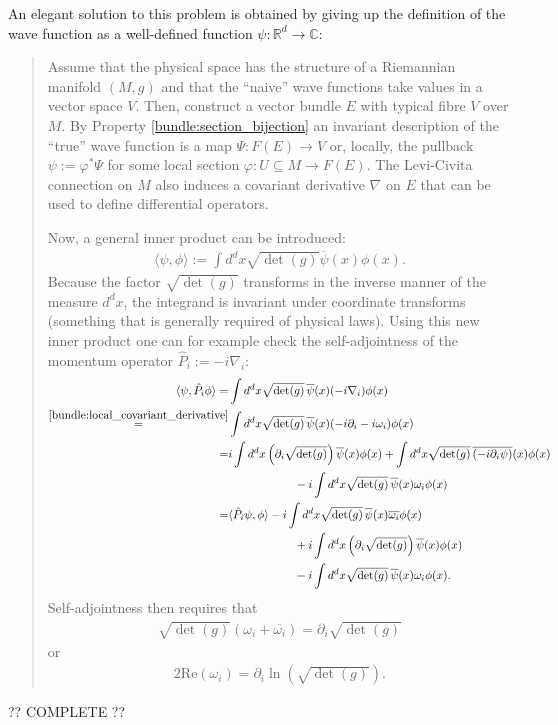     An elegant solution to this problem is obtained by giving up the definition of the wave function as a well-defined function $\psi:\mathbb{R}^d\rightarrow\mathbb{C}$:
    \begin{quote}
        Assume that the physical space has the structure of a Riemannian manifold $(M,g)$ and that the ``naive'' wave functions take values in a vector space $V$. Then, construct a vector bundle $E$ with typical fibre $V$ over $M$. By Property \ref{bundle:section_bijection} an invariant description of the ``true'' wave function is a map $\Psi:F(E)\rightarrow V$ or, locally, the pullback $\psi:=\varphi^*\Psi$ for some local section $\varphi:U\subseteq M\rightarrow F(E)$. The Levi-Civita connection on $M$ also induces a covariant derivative $\nabla$ on $E$ that can be used to define differential operators.

        Now, a general inner product can be introduced:
        \begin{gather}
            \langle\psi,\phi\rangle := \int d^dx\sqrt{\det(g)}\overline{\psi}(x)\phi(x).
        \end{gather}
        Because the factor $\sqrt{\det(g)}$ transforms in the inverse manner of the measure $d^dx$, the integrand is invariant under coordinate transforms (something that is generally required of physical laws). Using this new inner product one can for example check the self-adjointness of the momentum operator $\hat{P}_i := -i\nabla_i$:
        \begin{align*}
            \langle\psi,\hat{P}_i\phi\rangle = &\int d^dx\sqrt{\det(g)}\,\overline{\psi}(x)(-i\nabla_i)\phi(x)\\
            \overset{\eqref{bundle:local_covariant_derivative}}{=} &\int d^dx\sqrt{\det(g)}\,\overline{\psi}(x)(-i\partial_i - i\omega_i)\phi(x)\\
            = &i\int d^dx\left(\partial_i\sqrt{\det(g)}\right)\overline{\psi}(x)\phi(x) + \int d^dx\sqrt{\det(g)}\,\overline{(-i\partial_i\psi)}(x)\phi(x)\\
                &\hspace{2cm} -i\int d^dx\sqrt{\det(g)}\,\overline{\psi}(x)\omega_i\phi(x)\\
            = &\langle\hat{P}_i\psi,\phi\rangle -i\int d^dx\sqrt{\det(g)}\,\overline{\psi}(x)\overline{\omega_i}\phi(x)\\
                &\hspace{2cm} + i\int d^dx\left(\partial_i\sqrt{\det(g)}\right)\overline{\psi}(x)\phi(x)\\
                &\hspace{2cm} -i\int d^dx\sqrt{\det(g)}\,\overline{\psi}(x)\omega_i\phi(x).
        \end{align*}
        Self-adjointness then requires that
        \begin{gather}
            \sqrt{\det(g)}(\omega_i + \overline{\omega_i}) = \partial_i\sqrt{\det(g)}
        \end{gather}
        or
        \begin{gather}
            2\mathrm{Re}(\omega_i) = \partial_i\ln\left(\sqrt{\det(g)}\right).
        \end{gather}
    \end{quote}
    ?? COMPLETE ??